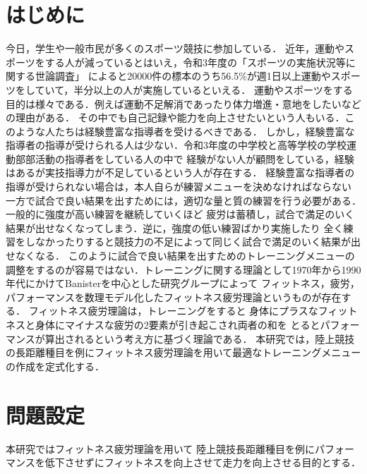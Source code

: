 \documentclass[12pt,fleqn]{jreport}
\begin{document}
\newpage
{}   %
\setlength{\baselineskip}{20pt}   %
\tableofcontents   %
\newpage
\listoffigures   %
\listoftables   %
\clearpage   %
\newpage
\chapter{はじめに}
\large
今日，学生や一般市民が多くのスポーツ競技に参加している．
近年，運動やスポーツをする人が減っているとはいえ，令和3年度の「スポーツの実施状況等に関する世論調査」
によると20000件の標本のうち56.5\%が週1日以上運動やスポーツをしていて，半分以上の人が実施しているといえる\cite{sports1}．
運動やスポーツをする目的は様々である．例えば運動不足解消であったり体力増進・意地をしたいなどの理由がある．
その中でも自己記録や能力を向上させたいという人もいる．このような人たちは経験豊富な指導者を受けるべきである．
しかし，経験豊富な指導者の指導が受けられる人は少ない．令和3年度の中学校と高等学校の学校運動部部活動の指導者をしている人の中で
経験がない人が顧問をしている，経験はあるが実技指導力が不足しているという人が存在する．
経験豊富な指導者の指導が受けられない場合は，本人自らが練習メニューを決めなければならない
一方で試合で良い結果を出すためには，適切な量と質の練習を行う必要がある．一般的に強度が高い練習を継続していくほど
疲労は蓄積し，試合で満足のいく結果が出せなくなってしまう．逆に，強度の低い練習ばかり実施したり
全く練習をしなかったりすると競技力の不足によって同じく試合で満足のいく結果が出せなくなる．
このように試合で良い結果を出すためのトレーニングメニューの調整をするのが容易ではない．トレーニングに関する理論として1970年から1990年代にかけてBanisterを中心とした研究グループによって
フィットネス，疲労，パフォーマンスを数理モデル化したフィットネス疲労理論というものが存在する\cite{bani}．
フィットネス疲労理論\cite{bani}は，トレーニングをすると
身体にプラスなフィットネスと身体にマイナスな疲労の2要素が引き起こされ両者の和を
とるとパフォーマンスが算出されるという考え方に基づく理論である．
本研究では，陸上競技の長距離種目を例にフィットネス疲労理論\cite{bani}を用いて最適なトレーニングメニューの作成を定式化する．
\newpage
\chapter{問題設定}
本研究ではフィットネス疲労理論\cite{bani}を用いて
陸上競技長距離種目を例にパフォーマンスを低下させずにフィットネスを向上させて走力を向上させる目的とする．
\vspace{1cm}
\end{document}
